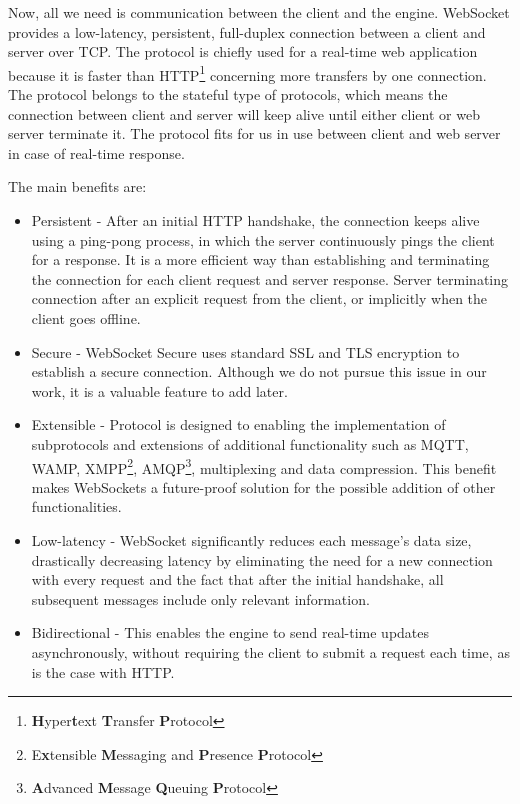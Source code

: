 Now, all we need is communication between the client and the engine. WebSocket \citep{websocket_wang_salim_moskovits_2013} provides a low-latency, persistent, full-duplex connection between a client and server over TCP. The protocol is chiefly used for a real-time web application because it is faster than HTTP\footnote{\textbf{H}yper\textbf{t}ext \textbf{T}ransfer \textbf{P}rotocol} concerning more transfers by one connection. The protocol belongs to the stateful type of protocols, which means the connection between client and server will keep alive until either client or web server terminate it. The protocol fits for us in use between client and web server in case of real-time response.

The main benefits are:

\begin{itemize}
	\item Persistent - After an initial HTTP handshake, the connection keeps alive using a ping-pong process, in which the server continuously pings the client for a response. It is a more efficient way than establishing and terminating the connection for each client request and server response. Server terminating connection after an explicit request from the client, or implicitly when the client goes offline.
	\item Secure - WebSocket Secure uses standard SSL and TLS encryption to establish a secure connection. Although we do not pursue this issue in our work, it is a valuable feature to add later.
	\item Extensible - Protocol is designed to enabling the implementation of subprotocols and extensions of additional functionality such as MQTT, WAMP, XMPP\footnote{E\textbf{x}tensible \textbf{M}essaging and \textbf{P}resence \textbf{P}rotocol}, AMQP\footnote{\textbf{A}dvanced \textbf{M}essage \textbf{Q}ueuing \textbf{P}rotocol }, multiplexing and data compression. This benefit makes WebSockets a future-proof solution for the possible addition of other functionalities.
	\item Low-latency - WebSocket significantly reduces each message's data size, drastically decreasing latency by eliminating the need for a new connection with every request and the fact that after the initial handshake, all subsequent messages include only relevant information.
	\item Bidirectional - This enables the engine to send real-time updates asynchronously, without requiring the client to submit a request each time, as is the case with HTTP. 
\end{itemize}

